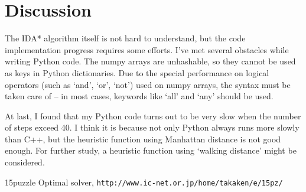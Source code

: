 \documentclass[a4paper, 11pt]{article}
\begin{document}
\begin{figure}
\centering
\end{figure}


\section{Discussion}
The IDA* algorithm itself is not hard to understand, but the code implementation progress requires some efforts. I've met several obstacles while writing Python code. The numpy arrays are unhashable, so they cannot be used as keys in Python dictionaries. Due to the special performance on logical operators (such as `and', `or', `not') used on numpy arrays, the syntax must be taken care of -- in most cases, keywords like `all' and `any' should be used.

At last, I found that my Python code turns out to be very slow when the number of steps exceed 40. I think it is because not only Python always runs more slowly than C++, but the heuristic function using Manhattan distance is not good enough. For further study, a heuristic function using `walking distance' might be considered.


\begin{thebibliography}{9}
15puzzle Optimal solver, \texttt{http://www.ic-net.or.jp/home/takaken/e/15pz/}
\end{thebibliography}
\end{document}
